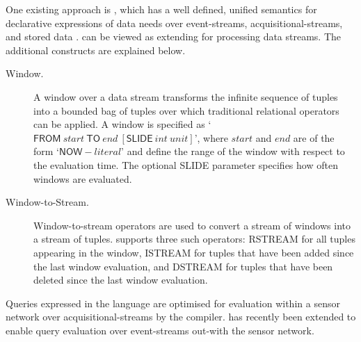 One existing approach is \sneeql, which has a well defined, unified semantics for declarative expressions of data needs over event-streams, acquisitional-streams, and stored data \cite{Brenninkmeijer_08}.
\sneeql can be viewed as extending \sql for processing data streams.
The additional constructs are explained below.
\begin{description}
\item[Window.] A window over a data stream transforms the infinite sequence of tuples into a bounded bag of tuples over which traditional relational operators can be applied. A window is specified as `$\textsf{FROM}\ {start}\ \textsf{TO}\ {end}\ [\textsf{SLIDE}\ {int}\ {unit}]$', where ${start}$ and ${end}$ are of the form `$\textsf{NOW} - {literal}$' and define the range of the window with respect to the evaluation time. The optional \textsf{SLIDE} parameter specifies how often windows are evaluated.

\item[Window-to-Stream.] Window-to-stream operators are used to convert a stream of windows into a stream of tuples. \sneeql supports three such operators: \textsf{RSTREAM} for all tuples appearing in the window, \textsf{ISTREAM} for tuples that have been added since the last window evaluation, and \textsf{DSTREAM} for tuples that have been deleted since the last window evaluation.
\end{description}
Queries expressed in the \sneeql language are optimised for evaluation within a sensor network over acquisitional-streams by the \snee compiler\cite{Galpin_09}. \snee has recently been extended to enable query evaluation over event-streams out-with the sensor network.


